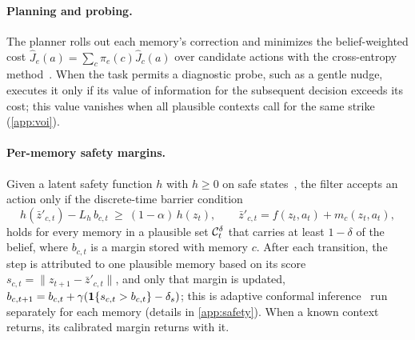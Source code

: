\paragraph{Planning and probing.}
The planner rolls out each memory's correction and minimizes the belief-weighted cost $\widehat J_e(a)=\sum_c\pi_e(c)\widehat J_c(a)$ over candidate actions with the cross-entropy method~\citep{rubinstein1999cem,chua2018pets}. When the task permits a diagnostic probe, such as a gentle nudge, \method executes it only if its value of information for the subsequent decision exceeds its cost; this value vanishes when all plausible contexts call for the same strike (\cref{app:voi}).

\paragraph{Per-memory safety margins.}
Given a latent safety function $h$ with $h\ge0$ on safe states~\citep{nakamura2026latentcbf}, the filter accepts an action only if the discrete-time barrier condition~\citep{agrawal2017discrete}
\begin{equation}\label{eq:cbf}
  h(\bar z'_{c,t})-L_h\,b_{c,t}\ \ge\ (1-\alpha)\,h(z_t),\qquad \bar z'_{c,t}=f(z_t,a_t)+m_c(z_t,a_t),
\end{equation}
holds for every memory in a plausible set $\mathcal{C}^{\delta}_t$ that carries at least $1-\delta$ of the belief, where $b_{c,t}$ is a margin stored with memory $c$. After each transition, the step is attributed to one plausible memory based on its score $s_{c,t}=\|z_{t+1}-\bar z'_{c,t}\|$, and only that margin is updated, $b_{c,t+1}=b_{c,t}+\gamma(\mathbf{1}\{s_{c,t}>b_{c,t}\}-\delta_s)$; this is adaptive conformal inference~\citep{gibbs2021adaptive} run separately for each memory (details in \cref{app:safety}). When a known context returns, its calibrated margin returns with it.
